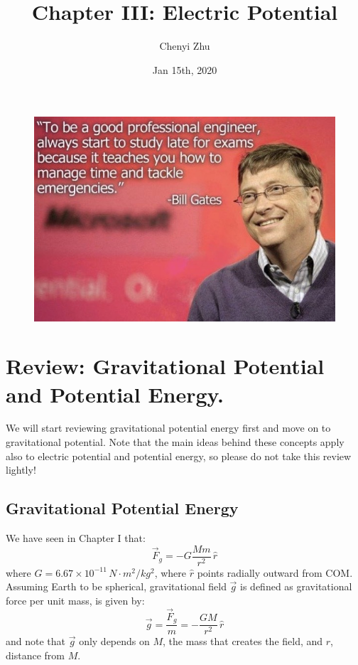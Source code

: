\documentclass[11pt, letterpaper]{article}
\title{Chapter III: Electric Potential}
\author{Chenyi Zhu}
\date{Jan 15th, 2020}
\begin{document}
\begin{titlingpage}
	\maketitle
	
	\begin{figure}[h!]
		\centering
		\includegraphics[scale=0.6]{emergencies}
		\label{fig:comedian}
	\end{figure}
		
\end{titlingpage}
	
\section{Review: Gravitational Potential and Potential Energy.} 

	We will start reviewing gravitational potential energy first and move on to gravitational potential. 
	Note that the main ideas behind these concepts apply also to electric potential and potential 
	energy, so please do not take this review lightly!
	\subsection{Gravitational Potential Energy}
	We have seen in Chapter I that: \[\vec{F}_g = -G\frac{Mm}{r^2}\, \hat{r}\] where 
	$G = 6.67\times 10^{-11}\,N\cdot m^2/kg^2$, where $\hat{r}$ points radially outward from
	COM. Assuming Earth to be spherical, gravitational field $\vec{g}$ is defined as 
	gravitational force per unit mass, is given by: \[\vec{g} = \frac{\vec{F}_g}{m} = -\frac{GM}{r^2}
	\, \hat{r}\] and note that $\vec{g}$ only depends on $M$, the mass that creates the field, and
	$r$, distance from $M$.
	
\end{document}
